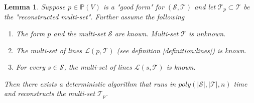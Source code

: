 \documentclass[12pt]{caltech_thesis}
\theoremstyle{plain}
\newtheorem{lemma}{Lemma}
\theoremstyle{definition}
\newcommand{\MS}{\mathcal{S}}
\newcommand{\MT}{\mathcal{T}}
\newcommand{\ML}{\mathcal{L}}
\newcommand{\PP}{\mathbb{P}}
\begin{document}
\begin{lemma}
 Suppose $p \in \PP(V)$ is a "good form" for $(\MS,\MT)$ and let $\MT_p\subset \MT$ be the "reconstructed multi-set".
 Further assume the following
 \begin{enumerate}
  \item The form $p$ and the multi-set $\MS$ are known. Multi-set $\MT$ is unknown.
  \item The multi-set of lines $\ML(p,\MT)$ (see definition \ref{definition:lines}) is known.
  \item For every $s\in \MS$, the multi-set of lines $\ML(s,\MT)$ is known.
 \end{enumerate}
 Then there exists a deterministic algorithm that runs in $poly(|\MS|, |\MT|,n)$ time and reconstructs the multi-set $\MT_p$.
\end{lemma}
\end{document}
